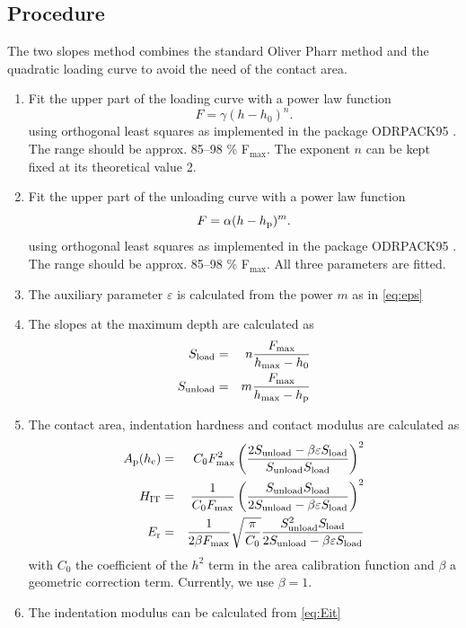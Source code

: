 \subsection{Procedure} \label{slopes_calc}
The two slopes method combines the standard Oliver Pharr method and the quadratic loading curve to avoid the need of the contact area.
\begin{enumerate} 
 \item 
 Fit the upper part of the loading curve with a power law function
$$
F = \gamma (h - h_0)^n.
$$
using orthogonal least squares as implemented in the package ODRPACK95 \cite{odrpack95}. The range should be approx. 85--98 \% F$_\mathrm{max}$. The exponent $n$ can be kept fixed at its theoretical value 2.
 \item 
 Fit the upper part of the unloading curve with a power law function
$$
F = \alpha (h - h_\mathrm{p})^m.
$$
using orthogonal least squares as implemented in the package ODRPACK95 \cite{odrpack95}. The range should be approx. 85--98 \% F$_\mathrm{max}$. All three parameters are fitted.
\item The auxiliary parameter $\varepsilon$ is calculated from the power $m$ as in \eqref{eq:eps}
\item The slopes at the maximum depth are calculated as
\begin{eqnarray} \label{eq:Stwo}
S_{\mathrm{load}} &=& n \frac{ F_\mathrm{max}}{h_\mathrm{max}-h_0} \\
S_{\mathrm{unload}} &=& m \frac{ F_\mathrm{max}}{h_\mathrm{max}-h_\mathrm{p}} 
\end{eqnarray}
\item 
The contact area, indentation hardness and contact modulus are calculated as
\begin{eqnarray}
 A_\mathrm{p}(h_\mathrm{c}) &=& C_0 F_\mathrm{max}^2 \left( \frac{2 S_{\mathrm{unload}} -\beta \varepsilon S_{\mathrm{load}}}{S_{\mathrm{unload}} S_{\mathrm{load}}} \right)^2 \\
 H_\mathrm{IT} &=& \frac1{C_0 F_\mathrm{max}} \left( \frac{S_{\mathrm{unload}} S_{\mathrm{load}}}{2 S_{\mathrm{unload}} -\beta \varepsilon S_{\mathrm{load}}} \right)^2 \\
 E_\mathrm{r} &=& \frac1{2 \beta F_\mathrm{max}}  \sqrt{\frac \pi{C_0}} \frac{S_{\mathrm{unload}}^2 S_{\mathrm{load}}}{2 S_{\mathrm{unload}} -\beta \varepsilon S_{\mathrm{load}}}
\end{eqnarray}
with $C_0$ the coefficient of the $h^2$ term in the area calibration function and $\beta$ a geometric correction term. Currently, we use $\beta = 1$.
\item
The indentation modulus can be calculated from \eqref{eq:Eit}

\end{enumerate}

